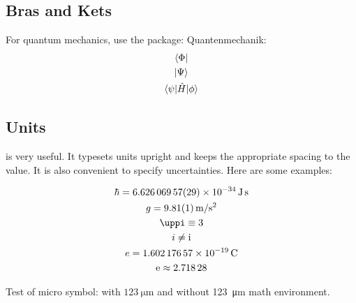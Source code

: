\subsection{Bras and Kets}
For quantum mechanics, use the  package:
Quantenmechanik:
\begin{gather}
	\bra{\Phi}\\
	\ket{\Psi}\\
	\braket{\psi|\hat{H}|\phi}
\end{gather}

\subsection{Units}
 is very useful. It typesets units upright and keeps the appropriate spacing to the value. It is also convenient to specify uncertainties. Here are some examples:

\begin{gather}
	\hbar = \SI[separate-uncertainty=false]{6.62606957(29)e-34}{\joule\second}\\
	g = \SI{9.81(1)}{\meter \per \s^2}\\
	\pi \equiv 3\\
	i \neq \i\\
	e = \SI{1.60217657e-19}{\coulomb}\\
	\e \approx \num{2.71828}\\
\end{gather}

Test of micro symbol: with $\SI{123}{\micro\meter}$ and without \SI{123}{\micro\meter} math environment.